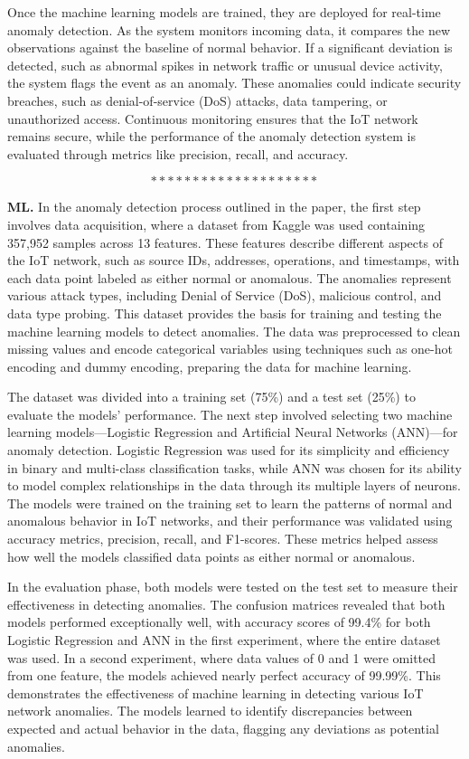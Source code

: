 Once the machine learning models are trained, they are deployed for real-time anomaly detection. As the system monitors incoming data, it compares the new observations against the baseline of normal behavior. If a significant deviation is detected, such as abnormal spikes in network traffic or unusual device activity, the system flags the event as an anomaly. These anomalies could indicate security breaches, such as denial-of-service (DoS) attacks, data tampering, or unauthorized access. Continuous monitoring ensures that the IoT network remains secure, while the performance of the anomaly detection system is evaluated through metrics like precision, recall, and accuracy\cite{84}.

$$********************$$

\textbf{ML.} In the anomaly detection process outlined in the paper, the first step involves data acquisition, where a dataset from Kaggle was used containing 357,952 samples across 13 features. These features describe different aspects of the IoT network, such as source IDs, addresses, operations, and timestamps, with each data point labeled as either normal or anomalous. The anomalies represent various attack types, including Denial of Service (DoS), malicious control, and data type probing. This dataset provides the basis for training and testing the machine learning models to detect anomalies. The data was preprocessed to clean missing values and encode categorical variables using techniques such as one-hot encoding and dummy encoding, preparing the data for machine learning.

The dataset was divided into a training set (75\%) and a test set (25\%) to evaluate the models' performance. The next step involved selecting two machine learning models—Logistic Regression and Artificial Neural Networks (ANN)—for anomaly detection. Logistic Regression was used for its simplicity and efficiency in binary and multi-class classification tasks, while ANN was chosen for its ability to model complex relationships in the data through its multiple layers of neurons. The models were trained on the training set to learn the patterns of normal and anomalous behavior in IoT networks, and their performance was validated using accuracy metrics, precision, recall, and F1-scores. These metrics helped assess how well the models classified data points as either normal or anomalous.

In the evaluation phase, both models were tested on the test set to measure their effectiveness in detecting anomalies. The confusion matrices revealed that both models performed exceptionally well, with accuracy scores of 99.4\% for both Logistic Regression and ANN in the first experiment, where the entire dataset was used. In a second experiment, where data values of 0 and 1 were omitted from one feature, the models achieved nearly perfect accuracy of 99.99\%. This demonstrates the effectiveness of machine learning in detecting various IoT network anomalies. The models learned to identify discrepancies between expected and actual behavior in the data, flagging any deviations as potential anomalies.

